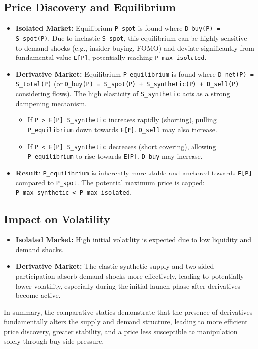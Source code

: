 \documentclass{article}
\begin{document}
\subsection{Price Discovery and Equilibrium}
\begin{itemize}
    \item \textbf{Isolated Market:} Equilibrium \lstinline{P_spot} is found where \lstinline{D_buy(P) = S_spot(P)}. Due to inelastic \lstinline{S_spot}, this equilibrium can be highly sensitive to demand shocks (e.g., insider buying, FOMO) and deviate significantly from fundamental value \lstinline{E[P]}, potentially reaching \lstinline{P_max_isolated}.
    \item \textbf{Derivative Market:} Equilibrium \lstinline{P_equilibrium} is found where \lstinline{D_net(P) = S_total(P)} (or \lstinline{D_buy(P) = S_spot(P) + S_synthetic(P) + D_sell(P)} considering flows). The high elasticity of \lstinline{S_synthetic} acts as a strong dampening mechanism.
        \begin{itemize}
            \item If \lstinline{P > E[P]}, \lstinline{S_synthetic} increases rapidly (shorting), pulling \lstinline{P_equilibrium} down towards \lstinline{E[P]}. \lstinline{D_sell} may also increase.
            \item If \lstinline{P < E[P]}, \lstinline{S_synthetic} decreases (short covering), allowing \lstinline{P_equilibrium} to rise towards \lstinline{E[P]}. \lstinline{D_buy} may increase.
        \end{itemize}
    \item \textbf{Result:} \lstinline{P_equilibrium} is inherently more stable and anchored towards \lstinline{E[P]} compared to \lstinline{P_spot}. The potential maximum price is capped: \lstinline{P_max_synthetic < P_max_isolated}.
\end{itemize}

\subsection{Impact on Volatility}
\begin{itemize}
    \item \textbf{Isolated Market:} High initial volatility is expected due to low liquidity and demand shocks.
    \item \textbf{Derivative Market:} The elastic synthetic supply and two-sided participation absorb demand shocks more effectively, leading to potentially lower volatility, especially during the initial launch phase after derivatives become active.
\end{itemize}
In summary, the comparative statics demonstrate that the presence of derivatives fundamentally alters the supply and demand structure, leading to more efficient price discovery, greater stability, and a price less susceptible to manipulation solely through buy-side pressure.
\end{document}
